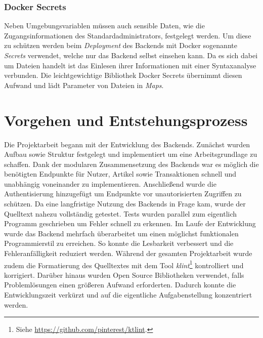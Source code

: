 \documentclass[a4paper, 11pt]{article}
\begin{document}
\subsubsection{Docker Secrets}
\label{subsubsec:backend:bibs:dockersecrets}

Neben Umgebungsvariablen müssen auch sensible Daten, wie die Zugangsinformationen des Standardadministrators, festgelegt werden.
Um diese zu schützen werden beim \textit{Deployment} des Backends mit Docker sogenannte \textit{Secrets} verwendet, welche nur das Backend selbst einsehen kann.
Da es sich dabei um Dateien handelt ist das Einlesen ihrer Informationen mit einer Syntaxanalyse verbunden.
Die leichtgewichtige Bibliothek Docker Secrets übernimmt diesen Aufwand und lädt Parameter von Dateien in \textit{Maps}.

\section{Vorgehen und Entstehungsprozess}
\label{sec:methodologies}

Die Projektarbeit begann mit der Entwicklung des Backends.
Zunächst wurden Aufbau sowie Struktur festgelegt und implementiert um eine Arbeitsgrundlage zu schaffen.
Dank der modularen Zusammensetzung des Backends war es möglich die benötigten Endpunkte für Nutzer, Artikel sowie Transaktionen schnell und unabhängig voneinander zu implementieren.
Anschließend wurde die Authentisierung hinzugefügt um Endpunkte vor unautorisierten Zugriffen zu schützen.
Da eine langfristige Nutzung des Backends in Frage kam, wurde der Quelltext nahezu vollständig getestet.
Tests wurden parallel zum eigentlich Programm geschrieben um Fehler schnell zu erkennen.
Im Laufe der Entwicklung wurde das Backend mehrfach überarbeitet um einen möglichst funktionalen Programmierstil zu erreichen.
So konnte die Lesbarkeit verbessert und die Fehleranfälligkeit reduziert werden.
Während der gesamten Projektarbeit wurde zudem die Formatierung des Quelltextes mit dem Tool \textit{klint}\footnote{Siehe \url{https://github.com/pinterest/ktlint}.} kontrolliert und korrigiert.
Darüber hinaus wurden Open Source Bibliotheken verwendet, falls Problemlösungen einen größeren Aufwand erforderten.
Dadurch konnte die Entwicklungszeit verkürzt und auf die eigentliche Aufgabenstellung konzentriert werden.
\end{document}
